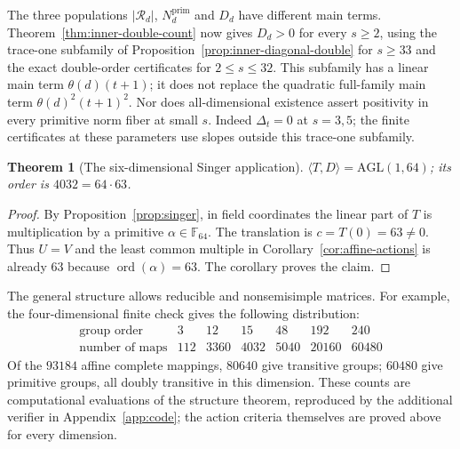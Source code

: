\documentclass[11pt]{article}
\newtheorem{theorem}{Theorem}[section]
\begin{document}
The three populations $|\mathcal R_d|$, $N_d^{\mathrm{prim}}$
and $D_d$ have different main terms. Theorem~\ref{thm:inner-double-count}
now gives $D_d>0$ for every $s\ge2$, using the trace-one subfamily
of Proposition~\ref{prop:inner-diagonal-double} for $s\ge33$
and the exact double-order certificates for $2\le s\le32$.
This subfamily has a linear main term $\theta(d)(t+1)$; it does
not replace the quadratic full-family main term
$\theta(d)^2(t+1)^2$. Nor does all-dimensional existence assert
positivity in every primitive norm fiber at small $s$.
Indeed $\Delta_t=0$ at $s=3,5$; the finite certificates at these
parameters use slopes outside this trace-one subfamily.


\begin{theorem}[The six-dimensional Singer application]\label{thm:agld}
$\langle T,D\rangle=\mathrm{AGL}(1,64)$; its order is $4032=64\cdot63$.
\end{theorem}
\begin{proof}
By Proposition~\ref{prop:singer}, in field coordinates the linear part of
$T$ is multiplication by a primitive $\alpha\in\mathbb F_{64}$.
The translation is $c=T(0)=63\ne0$. Thus $U=V$ and the least common multiple
in Corollary~\ref{cor:affine-actions} is already $63$ because
$\operatorname{ord}(\alpha)=63$. The corollary proves the claim.
\end{proof}

The general structure allows reducible and nonsemisimple matrices.
For example, the four-dimensional finite check gives the following distribution:
\[
\begin{array}{c|rrrrrr}
\text{group order}&3&12&15&48&192&240\\
\hline
\text{number of maps}&112&3360&4032&5040&20160&60480
\end{array}
\]
Of the $93184$ affine complete mappings, $80640$
give transitive groups; $60480$ give primitive groups, all doubly transitive
in this dimension. These counts are computational evaluations of the
structure theorem, reproduced by the additional verifier in Appendix~\ref{app:code};
the action criteria themselves are proved above for every dimension.
\end{document}
